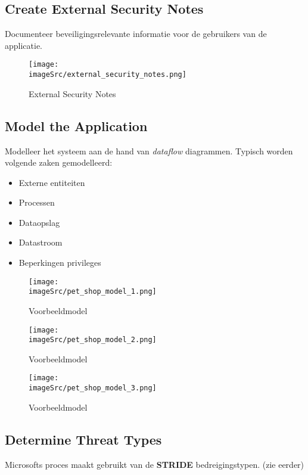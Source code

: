 \documentclass[../main.tex]{subfiles}
\begin{document}
\subsection{Create External Security Notes}
Documenteer beveiligingsrelevante informatie voor de gebruikers van de applicatie.
\begin{figure}[H]
    \centering
    \texttt{[image: \\imageSrc/external\_security\_notes.png]}
    \caption{External Security Notes}
    \label{fig:external_security_notes}
\end{figure}

\subsection{Model the Application}
Modelleer het systeem aan de hand van \textit{dataflow} diagrammen. Typisch worden volgende zaken gemodelleerd:
\begin{multicols}{2}
\begin{itemize}
	\item Externe entiteiten
	\item Processen
	\item Dataopslag
	\item Datastroom
	\item Beperkingen privileges
\end{itemize}
\end{multicols}

\begin{figure}[H]
    \centering
    \texttt{[image: \\imageSrc/pet\_shop\_model\_1.png]}
    \caption{Voorbeeldmodel}
    \label{example1}
\end{figure}

\begin{figure}[H]
    \centering
    \texttt{[image: \\imageSrc/pet\_shop\_model\_2.png]}
    \caption{Voorbeeldmodel}
    \label{example2}
\end{figure}

\begin{figure}[H]
    \centering
    \texttt{[image: \\imageSrc/pet\_shop\_model\_3.png]}
    \caption{Voorbeeldmodel}
    \label{example3}
\end{figure}

\subsection{Determine Threat Types}
Microsofts proces maakt gebruikt van de  \textbf{STRIDE} bedreigingstypen. (zie eerder)
\end{document}
